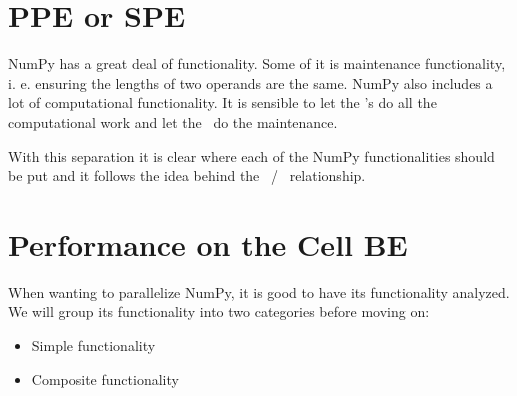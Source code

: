 




\section{PPE or SPE}

NumPy has a great deal of functionality. Some of it is maintenance
functionality, i. e. ensuring the lengths of two operands are the
same. NumPy also includes a lot of computational functionality. It is
sensible to let the \SPE{}'s do all the computational work and let
the \PPE\ do the maintenance.

With this separation it is clear where each of the NumPy
functionalities should be put and it follows the idea behind the \PPE\
/ \SPE\ relationship.

\section{Performance on the Cell BE}
\label{sec:performanceoncell}

When wanting to parallelize NumPy, it is good to have its
functionality analyzed. We will group its functionality into two
categories before moving on:

\begin{itemize}
\item{Simple functionality}
\item{Composite functionality}
\end{itemize}

